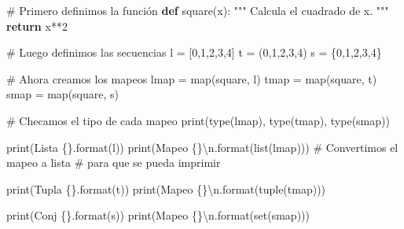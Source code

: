 \documentclass[
  spanish,
  letterpaper,
]{scrbook}
\newenvironment{Shaded}{\begin{snugshade}}{\end{snugshade}}
\newcommand{\BuiltInTok}[1]{\textcolor[rgb]{0.00,0.23,0.31}{#1}}
\newcommand{\CharTok}[1]{\textcolor[rgb]{0.13,0.47,0.30}{#1}}
\newcommand{\CommentTok}[1]{\textcolor[rgb]{0.37,0.37,0.37}{#1}}
\newcommand{\ControlFlowTok}[1]{\textcolor[rgb]{0.00,0.23,0.31}{\textbf{#1}}}
\newcommand{\DecValTok}[1]{\textcolor[rgb]{0.68,0.00,0.00}{#1}}
\newcommand{\KeywordTok}[1]{\textcolor[rgb]{0.00,0.23,0.31}{\textbf{#1}}}
\newcommand{\NormalTok}[1]{\textcolor[rgb]{0.00,0.23,0.31}{#1}}
\newcommand{\OperatorTok}[1]{\textcolor[rgb]{0.37,0.37,0.37}{#1}}
\newcommand{\SpecialCharTok}[1]{\textcolor[rgb]{0.37,0.37,0.37}{#1}}
\newcommand{\StringTok}[1]{\textcolor[rgb]{0.13,0.47,0.30}{#1}}
\theoremstyle{definition}
\theoremstyle{remark}
\begin{document}
\begin{Shaded}
\begin{Highlighting}[]
\CommentTok{\# Primero definimos la función}
\KeywordTok{def}\NormalTok{ square(x):}
    \CommentTok{"""}
\CommentTok{    Calcula el cuadrado de x.}
\CommentTok{    """}
    \ControlFlowTok{return}\NormalTok{ x}\OperatorTok{**}\DecValTok{2}

\CommentTok{\# Luego definimos las secuencias}
\NormalTok{l }\OperatorTok{=}\NormalTok{ [}\DecValTok{0}\NormalTok{,}\DecValTok{1}\NormalTok{,}\DecValTok{2}\NormalTok{,}\DecValTok{3}\NormalTok{,}\DecValTok{4}\NormalTok{]}
\NormalTok{t }\OperatorTok{=}\NormalTok{ (}\DecValTok{0}\NormalTok{,}\DecValTok{1}\NormalTok{,}\DecValTok{2}\NormalTok{,}\DecValTok{3}\NormalTok{,}\DecValTok{4}\NormalTok{)}
\NormalTok{s }\OperatorTok{=}\NormalTok{ \{}\DecValTok{0}\NormalTok{,}\DecValTok{1}\NormalTok{,}\DecValTok{2}\NormalTok{,}\DecValTok{3}\NormalTok{,}\DecValTok{4}\NormalTok{\}}

\CommentTok{\# Ahora creamos los mapeos}
\NormalTok{lmap }\OperatorTok{=} \BuiltInTok{map}\NormalTok{(square, l)}
\NormalTok{tmap }\OperatorTok{=} \BuiltInTok{map}\NormalTok{(square, t)}
\NormalTok{smap }\OperatorTok{=} \BuiltInTok{map}\NormalTok{(square, s)}

\CommentTok{\# Checamos el tipo de cada mapeo}
\BuiltInTok{print}\NormalTok{(}\BuiltInTok{type}\NormalTok{(lmap), }\BuiltInTok{type}\NormalTok{(tmap), }\BuiltInTok{type}\NormalTok{(smap))}

\BuiltInTok{print}\NormalTok{(}\StringTok{\textquotesingle{}Lista }\SpecialCharTok{\{\}}\StringTok{\textquotesingle{}}\NormalTok{.}\BuiltInTok{format}\NormalTok{(l))}
\BuiltInTok{print}\NormalTok{(}\StringTok{\textquotesingle{}Mapeo }\SpecialCharTok{\{\}}\CharTok{\textbackslash{}n}\StringTok{\textquotesingle{}}\NormalTok{.}\BuiltInTok{format}\NormalTok{(}\BuiltInTok{list}\NormalTok{(lmap))) }\CommentTok{\# Convertimos el mapeo a lista}
                                       \CommentTok{\# para que se pueda imprimir}

\BuiltInTok{print}\NormalTok{(}\StringTok{\textquotesingle{}Tupla }\SpecialCharTok{\{\}}\StringTok{\textquotesingle{}}\NormalTok{.}\BuiltInTok{format}\NormalTok{(t))}
\BuiltInTok{print}\NormalTok{(}\StringTok{\textquotesingle{}Mapeo }\SpecialCharTok{\{\}}\CharTok{\textbackslash{}n}\StringTok{\textquotesingle{}}\NormalTok{.}\BuiltInTok{format}\NormalTok{(}\BuiltInTok{tuple}\NormalTok{(tmap)))}

\BuiltInTok{print}\NormalTok{(}\StringTok{\textquotesingle{}Conj }\SpecialCharTok{\{\}}\StringTok{\textquotesingle{}}\NormalTok{.}\BuiltInTok{format}\NormalTok{(s))}
\BuiltInTok{print}\NormalTok{(}\StringTok{\textquotesingle{}Mapeo }\SpecialCharTok{\{\}}\CharTok{\textbackslash{}n}\StringTok{\textquotesingle{}}\NormalTok{.}\BuiltInTok{format}\NormalTok{(}\BuiltInTok{set}\NormalTok{(smap)))}
\end{Highlighting}
\end{Shaded}
\end{document}
